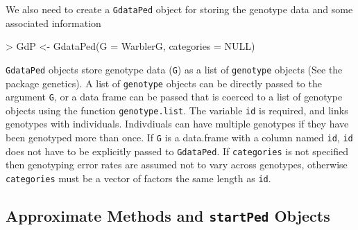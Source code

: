 \documentclass{article}
\begin{document}
We also need to create a \texttt{GdataPed} object for storing the genotype data and some associated information

\begin{Schunk}
\begin{Sinput}
> GdP <- GdataPed(G = WarblerG, categories = NULL)
\end{Sinput}
\end{Schunk}

\texttt{GdataPed} objects store genotype data (\texttt{G}) as a list of \texttt{genotype} objects (See the package genetics).  A list of \texttt{genotype} objects can be directly passed to the argument \texttt{G}, or a data frame can be passed that is coerced to a list of genotype objects using the function \texttt{genotype.list}. The variable \texttt{id} is required, and links genotypes with individuals.  Indivdiuals can have multiple genotypes if they have been genotyped more than once.  If \texttt{G} is a data.frame with a column named \texttt{id}, \texttt{id} does not have to be explicitly passed to \texttt{GdataPed}.  If \texttt{categories} is not specified then genotyping error rates are assumed not to vary across genotypes, otherwise \texttt{categories} must be a vector of factors the same length as \texttt{id}.\\

\subsection{Approximate Methods and \texttt{startPed} Objects}
\label{approx-sec}
\end{document}
